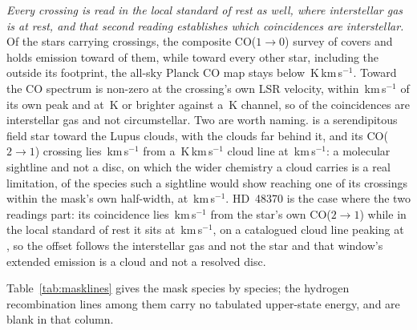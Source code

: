 \emph{Every crossing is read in the local standard of rest as well, where
interstellar gas is at rest, and that second reading
establishes which coincidences are interstellar.} Of the \LsNLos{} stars
carrying crossings, the composite CO($1\to0$) survey of
\citet{DameThaddeus2022,Dame2001} covers \LsNLosCov{} and holds emission
toward \LsNLosDet{} of them, while toward every other star, including the
\LsNLosOut{} outside its footprint, the all-sky Planck CO map
\citep{PlanckCO2016} stays below \LsPlanckMax\,K\,km\,s$^{-1}$. Toward
\LsCloudStars{} the CO spectrum is non-zero at the crossing's own LSR
velocity, within \LsCloudDvMax\,km\,s$^{-1}$ of its own peak and at
\LsCloudTMin\,K or brighter against a \LsCoRms\,K channel, so \LsNCloud{} of
the \MkNCoinc{} coincidences are interstellar gas and not circumstellar.
Two are worth naming. \BkAlmaName{} is a serendipitous field star toward the
Lupus clouds, with the clouds far behind it, and its CO($2\to1$) crossing lies
\LsLupDv\,km\,s$^{-1}$ from a \LsLupWco\,K\,km\,s$^{-1}$ cloud line at
\LsLupVco\,km\,s$^{-1}$: a molecular sightline and not a disc, on which the
wider chemistry a cloud carries is a real limitation, \XlLupNamedN{} of the
species such a sightline would show reaching one of its crossings within the
mask's own half-width, \XlLupNamedMol{} at \XlLupNamedDv\,km\,s$^{-1}$.
HD~48370 is the case where the two readings part: its coincidence lies
\LsHdDvStar\,km\,s$^{-1}$ from the star's own CO($2\to1$) while in the local
standard of rest it sits at \LsHdVfeat\,km\,s$^{-1}$, on a catalogued cloud
line peaking at \LsHdVco, so the offset follows the interstellar gas and not
the star and that window's extended emission is a cloud and not a resolved
disc.

Table~\ref{tab:masklines} gives the
mask species by species; the hydrogen recombination lines among them carry
no tabulated upper-state energy, and are blank in that column.

\begin{table}
\centering
\footnotesize
\caption{The line mask, by species: the number $N$ of transitions, the
frequency range they span inside the searched intervals and their
upper-state energies.}
\label{tab:masklines}

\end{table}


